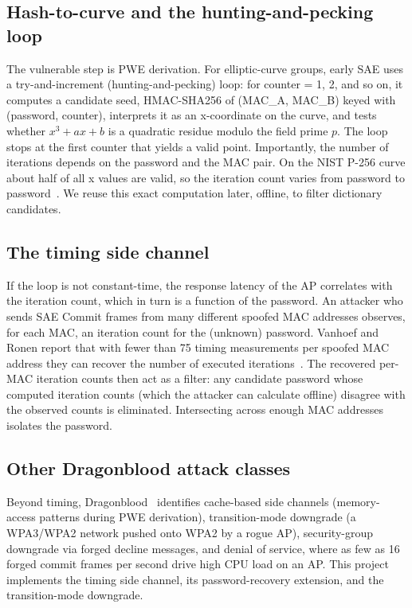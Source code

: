 \documentclass[11pt,letterpaper]{article}
\begin{document}
\subsection{Hash-to-curve and the hunting-and-pecking loop}
The vulnerable step is PWE derivation. For elliptic-curve groups, early SAE uses
a try-and-increment (hunting-and-pecking) loop: for counter = 1, 2, and so on, it
computes a candidate seed, HMAC-SHA256 of (MAC\_A, MAC\_B) keyed with (password,
counter), interprets it as an x-coordinate on the curve, and tests whether
$x^3 + ax + b$ is a quadratic residue modulo the field prime $p$. The loop stops
at the first counter that yields a valid point. Importantly, the number of
iterations depends on the password and the MAC pair. On the NIST P-256 curve
about half of all x values are valid, so the iteration count varies from password
to password~\cite{vanhoef2020dragonblood}. We reuse this exact computation later,
offline, to filter dictionary candidates.

\subsection{The timing side channel}
If the loop is not constant-time, the response latency of the AP correlates with
the iteration count, which in turn is a function of the password. An attacker who
sends SAE Commit frames from many different spoofed MAC addresses observes, for
each MAC, an iteration count for the (unknown) password. Vanhoef and Ronen report
that with fewer than 75 timing measurements per spoofed MAC address they can
recover the number of executed iterations~\cite{dragonblood_site}. The recovered
per-MAC iteration counts then act as a filter: any candidate password whose
computed iteration counts (which the attacker can calculate offline) disagree
with the observed counts is eliminated. Intersecting across enough MAC addresses
isolates the password.

\subsection{Other Dragonblood attack classes}
Beyond timing, Dragonblood~\cite{vanhoef2020dragonblood,dragonblood_site}
identifies cache-based side channels (memory-access patterns during PWE
derivation), transition-mode downgrade (a WPA3/WPA2 network pushed onto WPA2 by a
rogue AP), security-group downgrade via forged decline messages, and denial of
service, where as few as 16 forged commit frames per second drive high CPU load
on an AP. This project implements the timing side channel, its password-recovery
extension, and the transition-mode downgrade.
\end{document}
